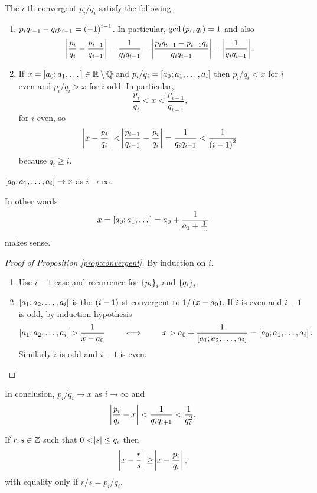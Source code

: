 \begin{proposition}
\label{prop:convergent}
The $ i $-th convergent $ p_i / q_i $ satisfy the following.
\begin{enumerate}
\item $ p_iq_{i - 1} - q_ip_{i - 1} = \br{-1}^{i - 1} $. In particular, $ \gcd\br{p_i, q_i} = 1 $ and also
$$ \abs{\dfrac{p_i}{q_i} - \dfrac{p_{i - 1}}{q_{i - 1}}} = \dfrac{1}{q_iq_{i - 1}} = \abs{\dfrac{p_iq_{i - 1} - p_{i - 1}q_i}{q_iq_{i - 1}}} = \abs{\dfrac{1}{q_iq_{i - 1}}}. $$
\item If $ x = \sbr{a_0; a_1, \dots} \in \R \setminus \Q $ and $ p_i / q_i = \sbr{a_0; a_1, \dots, a_i} $ then $ p_i / q_i < x $ for $ i $ even and $ p_i / q_i > x $ for $ i $ odd. In particular,
$$ \dfrac{p_i}{q_i} < x < \dfrac{p_{i - 1}}{q_{i - 1}}, $$
for $ i $ even, so
$$ \abs{x - \dfrac{p_i}{q_i}} < \abs{\dfrac{p_{i - 1}}{q_{i - 1}} - \dfrac{p_i}{q_i}} = \dfrac{1}{q_iq_{i - 1}} < \dfrac{1}{\br{i - 1}^2} $$
because $ q_i \ge i $.
\end{enumerate}
\end{proposition}

\pagebreak

\begin{corollary}
$ \sbr{a_0; a_1, \dots, a_i} \to x $ as $ i \to \infty $.
\end{corollary}

In other words
$$ x = \sbr{a_0; a_1, \dots} = a_0 + \dfrac{1}{a_1 + \tfrac{1}{\dots}} $$
makes sense.

\begin{proof}[Proof of Proposition \ref{prop:convergent}]
By induction on $ i $.
\begin{enumerate}
\item Use $ i - 1 $ case and recurrence for $ \cbr{p_i}_i $ and $ \cbr{q_i}_i $.
\item $ \sbr{a_1; a_2, \dots, a_i} $ is the $ \br{i - 1} $-st convergent to $ 1 / \br{x - a_0} $. If $ i $ is even and $ i - 1 $ is odd, by induction hypothesis
$$ \sbr{a_1; a_2, \dots, a_i} > \dfrac{1}{x - a_0} \qquad \iff \qquad x > a_0 + \dfrac{1}{\sbr{a_1; a_2, \dots, a_i}} = \sbr{a_0; a_1, \dots, a_i}. $$
Similarly $ i $ is odd and $ i - 1 $ is even.
\end{enumerate}
\end{proof}

In conclusion, $ p_i / q_i \to x $ as $ i \to \infty $ and
$$ \abs{\dfrac{p_i}{q_i} - x} < \dfrac{1}{q_iq_{i + 1}} < \dfrac{1}{q_i^2}. $$

\begin{theorem}
If $ r, s \in \mathbb{Z} $ such that $ 0 < \abs{s} \le q_i $ then
$$ \abs{x - \dfrac{r}{s}} \ge \abs{x - \dfrac{p_i}{q_i}}, $$
with equality only if $ r / s = p_i / q_i $.
\end{theorem}

